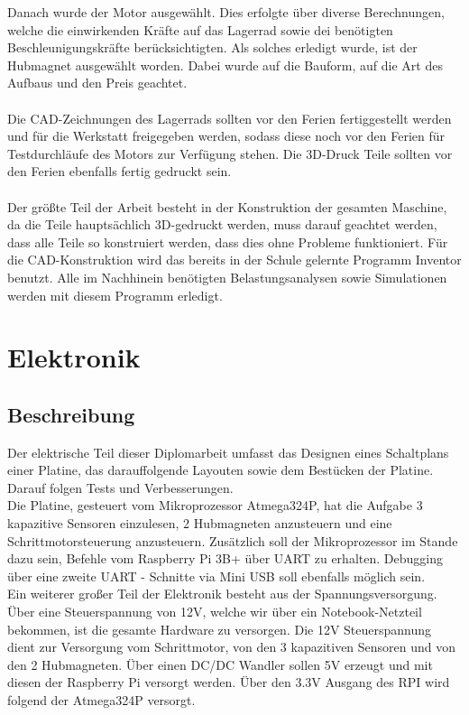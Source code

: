 Danach wurde der Motor ausgewählt. Dies erfolgte über diverse Berechnungen, welche die einwirkenden Kräfte auf das Lagerrad sowie dei benötigten Beschleunigungskräfte berücksichtigten.
Als solches erledigt wurde, ist der Hubmagnet ausgewählt worden. Dabei wurde auf die Bauform, auf die Art des Aufbaus und den Preis geachtet.
\\\\
Die CAD-Zeichnungen des Lagerrads sollten vor den Ferien fertiggestellt werden und für die Werkstatt freigegeben werden, sodass diese noch vor den Ferien für Testdurchläufe des Motors zur Verfügung stehen.
Die 3D-Druck Teile sollten vor den Ferien ebenfalls fertig gedruckt sein.
\\\\
Der größte Teil der Arbeit besteht in der Konstruktion der gesamten Maschine, da die Teile hauptsächlich 3D-gedruckt werden, muss darauf geachtet werden, dass alle Teile so konstruiert werden, dass dies ohne Probleme funktioniert.
Für die CAD-Konstruktion wird das bereits in der Schule gelernte Programm Inventor benutzt. Alle im Nachhinein benötigten Belastungsanalysen sowie Simulationen werden mit diesem Programm erledigt.


\chapter{Elektronik}
\label{sec:Elektronik}
\section{Beschreibung}

Der elektrische Teil dieser Diplomarbeit umfasst das Designen eines Schaltplans einer Platine, das darauffolgende Layouten sowie dem Bestücken der Platine. Darauf folgen Tests und Verbesserungen.\\

Die Platine, gesteuert vom Mikroprozessor Atmega324P, hat die Aufgabe 3 kapazitive Sensoren einzulesen, 2 Hubmagneten anzusteuern und eine Schrittmotorsteuerung anzusteuern.
Zusätzlich soll der Mikroprozessor im Stande dazu sein, Befehle vom Raspberry Pi 3B+ über UART zu erhalten. Debugging über eine zweite UART - Schnitte via Mini USB soll ebenfalls möglich sein. \\

Ein weiterer großer Teil der Elektronik besteht aus der Spannungsversorgung. Über eine Steuerspannung von 12V, welche wir über ein Notebook-Netzteil bekommen, ist die gesamte Hardware zu versorgen.
Die 12V Steuerspannung dient zur Versorgung vom Schrittmotor, von den 3 kapazitiven Sensoren und von den 2 Hubmagneten. Über einen DC/DC Wandler sollen 5V erzeugt und mit diesen der Raspberry Pi versorgt werden.
Über den 3.3V Ausgang des RPI wird folgend der Atmega324P versorgt.





